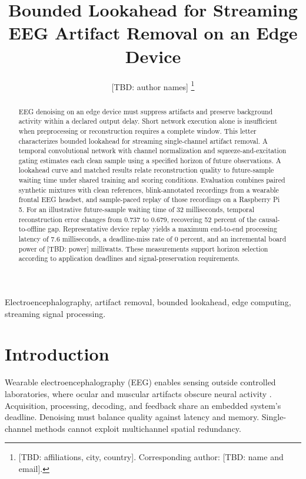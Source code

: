\documentclass[letterpaper,journal]{IEEEtran}
\newcommand{\TBD}[1]{\textcolor{blue!65!black}{\textnormal{[TBD: #1]}}}
\begin{document}
\title{Bounded Lookahead for Streaming EEG Artifact Removal on an Edge Device}
\author{\TBD{author names}%
\thanks{\TBD{affiliations, city, country}. Corresponding author: \TBD{name and email}.}}

\maketitle
\begin{abstract}
EEG denoising on an edge device must suppress artifacts and preserve background activity within a declared output delay. Short network execution alone is insufficient when preprocessing or reconstruction requires a complete window. This letter characterizes bounded lookahead for streaming single-channel artifact removal. A temporal convolutional network with channel normalization and squeeze-and-excitation gating estimates each clean sample using a specified horizon of future observations. A lookahead curve and matched results relate reconstruction quality to future-sample waiting time under shared training and scoring conditions. Evaluation combines paired synthetic mixtures with clean references, blink-annotated recordings from a wearable frontal EEG headset, and sample-paced replay of those recordings on a Raspberry Pi 5. For an illustrative future-sample waiting time of 32 milliseconds, temporal reconstruction error changes from 0.737 to 0.679, recovering 52 percent of the causal-to-offline gap. Representative device replay yields a maximum end-to-end processing latency of 7.6 milliseconds, a deadline-miss rate of 0 percent, and an incremental board power of \TBD{power} milliwatts. These measurements support horizon selection according to application deadlines and signal-preservation requirements.
\end{abstract}
\begin{IEEEkeywords}
Electroencephalography, artifact removal, bounded lookahead, edge computing, streaming signal processing.
\end{IEEEkeywords}

\section{Introduction}
Wearable electroencephalography (EEG) enables sensing outside controlled laboratories, where ocular and muscular artifacts obscure neural activity \cite{casson2019wearable}. Acquisition, processing, decoding, and feedback share an embedded system's deadline. Denoising must balance quality against latency and memory. Single-channel methods cannot exploit multichannel spatial redundancy.
\end{document}
